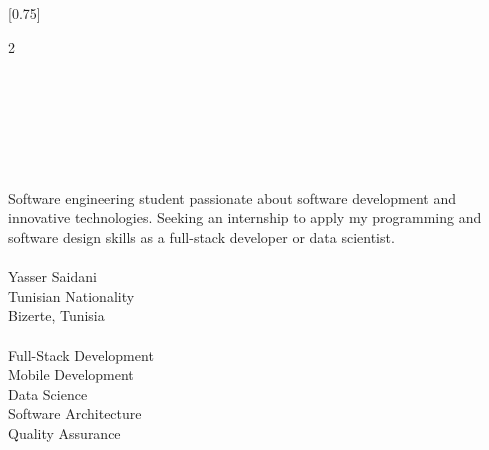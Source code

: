 \documentclass[lighthipster]{simplehipstercv}
\begin{document}
\thispagestyle{empty}


\vspace{0.4em}

\setlength{\columnsep}{1.2cm}
[0.75]
\begin{paracol}{2}
\paracolbackgroundoptions

\footnotesize
{\setasidefontcolour
\raggedleft

\begin{center}
\end{center}
\vspace{0.6em}

\\[0.5em]
\faEnvelope{}\\[0.4em]
\faPhone{}\\[0.4em]
\faGithub{}\\[0.4em]
\faMapMarker{}\\[0.8em]

\\[0.5em]
{\footnotesize
Software engineering student passionate
about software development and innovative
technologies. Seeking an internship to
apply my programming and software design
skills as a full-stack developer or
data scientist.}\\[0.8em]

\\[0.5em]
Yasser Saidani\\[0.3em]
Tunisian Nationality\\[0.3em]
Bizerte, Tunisia\\[0.8em]

\\[0.5em]
Full-Stack Development\\[0.3em]
Mobile Development\\[0.3em]
Data Science\\[0.3em]
Software Architecture\\[0.3em]
Quality Assurance\\[0.8em]

}
\end{paracol}
\end{document}
